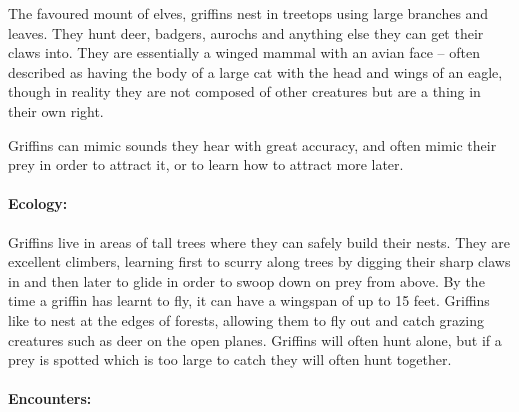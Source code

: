 \begin{multicols}{2}
\begin{boxtext}
\end{boxtext}

The favoured mount of elves, griffins nest in treetops using large branches and leaves.
They hunt deer, badgers, aurochs and anything else they can get their claws into.
They are essentially a winged mammal with an avian face -- often described as having the body of a large cat with the head and wings of an eagle, though in reality they are not composed of other creatures but are a thing in their own right.

Griffins can mimic sounds they hear with great accuracy, and often mimic their prey in order to attract it, or to learn how to attract more later.


\paragraph{Ecology:} Griffins live in areas of tall trees where they can safely build their nests.
They are excellent climbers, learning first to scurry along trees by digging their sharp claws in and then later to glide in order to swoop down on prey from above.
By the time a griffin has learnt to fly, it can have a wingspan of up to 15 feet.
Griffins like to nest at the edges of forests, allowing them to fly out and catch grazing creatures such as deer on the open planes.
Griffins will often hunt alone, but if a prey is spotted which is too large to catch  they will often hunt together.

\paragraph{Encounters:}

\begin{itemize}


\end{itemize}
\end{multicols}

